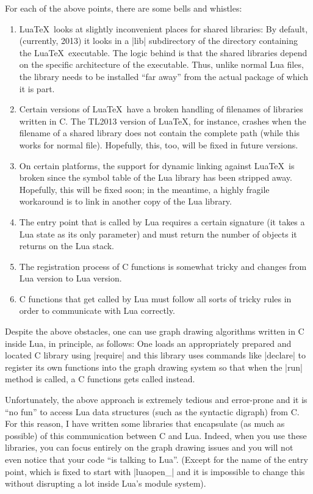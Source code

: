 For each of the above points, there are some bells and whistles:
%
\begin{enumerate}
    \item Lua\TeX\ looks at slightly inconvenient places for shared libraries:
        By default, (currently, 2013) it looks in a |lib| subdirectory of the
        directory containing the Lua\TeX\ executable. The logic behind is that
        the shared libraries depend on the specific architecture of the
        executable. Thus, unlike normal Lua files, the library needs to be
        installed ``far away'' from the actual package of which it is part.
    \item Certain versions of Lua\TeX\ have a broken handling of filenames of
        libraries written in C. The TL2013 version of Lua\TeX, for instance,
        crashes when the filename of a shared library does not contain the
        complete path (while this works for normal file). Hopefully, this, too,
        will be fixed in future versions.
    \item On certain platforms, the support for dynamic linking against
        Lua\TeX\ is broken since the symbol table of the Lua library has been
        stripped away. Hopefully, this will be fixed soon; in the meantime, a
        highly fragile workaround is to link in another copy of the Lua
        library.
    \item The entry point that is called by Lua requires a certain signature
        (it takes a Lua state as its only parameter) and must return the number
        of objects it returns on the Lua stack.
    \item The registration process of C functions is somewhat tricky and
        changes from Lua version to Lua version.
    \item C functions that get called by Lua must follow all sorts of tricky
        rules in order to communicate with Lua correctly.
\end{enumerate}

Despite the above obstacles, one can use graph drawing algorithms written in C
inside Lua, in principle, as follows: One loads an appropriately prepared and
located C library using |require| and this library uses commands like |declare|
to register its own functions into the graph drawing system so that when the
|run| method is called, a C functions gets called instead.

Unfortunately, the above approach is extremely tedious and error-prone and it
is ``no fun'' to access Lua data structures (such as the syntactic digraph)
from C. For this reason, I have written some libraries that encapsulate (as
much as possible) of this communication between C and Lua. Indeed, when you use
these libraries, you can focus entirely on the graph drawing issues and you
will not even notice that your code ``is talking to Lua''. (Except for the name
of the entry point, which is fixed to start with |luaopen_| and it is
impossible to change this without disrupting a lot inside Lua's module system).

